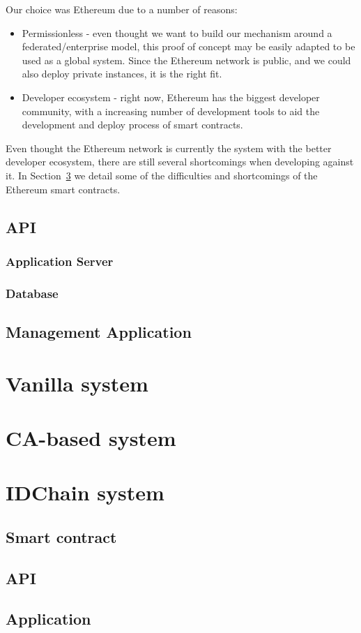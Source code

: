 Our choice was Ethereum due to a number of reasons:

\begin{itemize}
	\item Permissionless - even thought we want to build our mechanism around a federated/enterprise model, this proof of concept may be easily adapted to be used as a global system.
  Since the Ethereum network is public, and we could also deploy private instances, it is the right fit.
	\item Developer ecosystem - right now, Ethereum has the biggest developer community, with a increasing number of development tools to aid the development and deploy process of smart contracts.
\end{itemize}

Even thought the Ethereum network is currently the system with the better developer ecosystem, there are still several shortcomings when developing against it.
In Section~\ref{implementation:idchain} we detail some of the difficulties and shortcomings of the Ethereum smart contracts.

\subsection{API}

\subsubsection{Application Server}

\subsubsection{Database}


\subsection{Management Application}



\section{Vanilla system}


\section{CA-based system}


\section{IDChain system}\label{implementation:idchain}

\subsection{Smart contract}

\subsection{API}

\subsection{Application}
